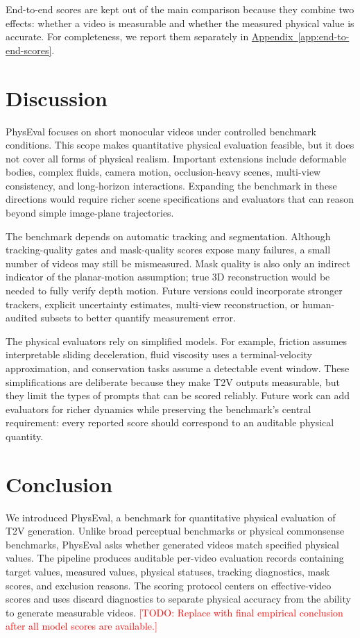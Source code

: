 \documentclass{article}
\newcommand{\bench}{PhysEval}
\newcommand{\todo}[1]{\textcolor{red}{[TODO: #1]}}
\begin{document}
End-to-end scores are kept out of the main comparison because they combine two effects: whether a video is measurable and whether the measured physical value is accurate.
For completeness, we report them separately in \hyperref[app:end-to-end-scores]{Appendix~\ref{app:end-to-end-scores}}.

\section{Discussion}

\bench{} focuses on short monocular videos under controlled benchmark conditions.
This scope makes quantitative physical evaluation feasible, but it does not cover all forms of physical realism.
Important extensions include deformable bodies, complex fluids, camera motion, occlusion-heavy scenes, multi-view consistency, and long-horizon interactions.
Expanding the benchmark in these directions would require richer scene specifications and evaluators that can reason beyond simple image-plane trajectories.

The benchmark depends on automatic tracking and segmentation.
Although tracking-quality gates and mask-quality scores expose many failures, a small number of videos may still be mismeasured.
Mask quality is also only an indirect indicator of the planar-motion assumption; true 3D reconstruction would be needed to fully verify depth motion.
Future versions could incorporate stronger trackers, explicit uncertainty estimates, multi-view reconstruction, or human-audited subsets to better quantify measurement error.

The physical evaluators rely on simplified models.
For example, friction assumes interpretable sliding deceleration, fluid viscosity uses a terminal-velocity approximation, and conservation tasks assume a detectable event window.
These simplifications are deliberate because they make T2V outputs measurable, but they limit the types of prompts that can be scored reliably.
Future work can add evaluators for richer dynamics while preserving the benchmark's central requirement: every reported score should correspond to an auditable physical quantity.

\section{Conclusion}

We introduced \bench, a benchmark for quantitative physical evaluation of T2V generation.
Unlike broad perceptual benchmarks or physical commonsense benchmarks, \bench{} asks whether generated videos match specified physical values.
The pipeline produces auditable per-video evaluation records containing target values, measured values, physical statuses, tracking diagnostics, mask scores, and exclusion reasons.
The scoring protocol centers on effective-video scores and uses discard diagnostics to separate physical accuracy from the ability to generate measurable videos.
\todo{Replace with final empirical conclusion after all model scores are available.}
\end{document}
